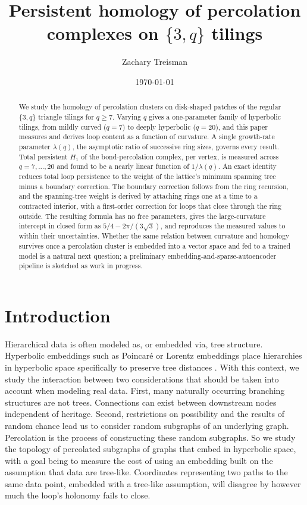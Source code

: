 \documentclass[11pt]{article}
\title{Persistent homology of percolation complexes on $\{3,q\}$ tilings}
\author{Zachary Treisman}
\date{\today}
\begin{document}
\maketitle

\begin{abstract}
We study the homology of percolation clusters on disk-shaped patches of the regular $\{3,q\}$ triangle tilings for $q\ge7$. Varying $q$ gives a one-parameter family of hyperbolic tilings, from mildly curved ($q=7$) to deeply hyperbolic ($q=20$), and this paper measures and derives loop content as a function of curvature. A single growth-rate parameter $\lambda(q)$, the asymptotic ratio of successive ring sizes, governs every result. Total persistent $H_1$ of the bond-percolation complex, per vertex, is measured across $q=7,\dots,20$ and found to be a nearly linear function of $1/\lambda(q)$. An exact identity reduces total loop persistence to the weight of the lattice's minimum spanning tree minus a boundary correction. The boundary correction follows from the ring recursion, and the spanning-tree weight is derived by attaching rings one at a time to a contracted interior, with a first-order correction for loops that close through the ring outside. The resulting formula has no free parameters, gives the large-curvature intercept in closed form as $5/4-2\pi/(3\sqrt3)$, and reproduces the measured values to within their uncertainties. Whether the same relation between curvature and homology survives once a percolation cluster is embedded into a vector space and fed to a trained model is a natural next question; a preliminary embedding-and-sparse-autoencoder pipeline is sketched as work in progress.
\end{abstract}

\section{Introduction}
\label{sec:intro}

Hierarchical data is often modeled as, or embedded via, tree structure. Hyperbolic embeddings such as Poincar\'{e} or Lorentz embeddings place hierarchies in hyperbolic space specifically to preserve tree distances \citep{nickel2017}. With this context, we study the interaction between two considerations that should be taken into account when modeling real data. First, many naturally occurring branching structures are not trees. Connections can exist between downstream nodes independent of heritage. Second, restrictions on possibility and the results of random chance lead us to consider random subgraphs of an underlying graph. Percolation is the process of constructing these random subgraphs. So we study the topology of percolated subgraphs of graphs that embed in hyperbolic space, with a goal being to measure the cost of using an embedding built on the assumption that data are tree-like. Coordinates representing two paths to the same data point, embedded with a tree-like assumption, will disagree by however much the loop's holonomy fails to close.
\end{document}
